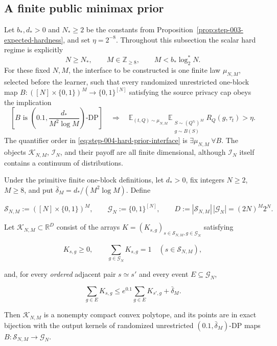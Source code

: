 \subsection{A finite public minimax prior}\label{app:step-004}
Let $b_*,d_*>0$ and $N_*\ge2$ be the constants from
Proposition~\ref{prop:step-003-expected-hardness}, and set
$\eta=2^{-8}$.  Throughout this subsection the scalar hard regime is
explicitly
\begin{equation}
N\ge N_*,\qquad M\in\mathbb Z_{\ge8},\qquad
M<b_*\log_2^*N.
\tag{S4.H}\label{eq:step-004-hard-regime}
\end{equation}
For these fixed $N,M$, the interface to be constructed is one finite law
$\mu_{N,M}$, selected before the learner, such that every randomized
unrestricted one-block map
$B:([N]\times\{0,1\})^M\to\{0,1\}^{[N]}$ satisfying the source privacy cap
obeys the implication
\begin{equation}
\left[
B\text{ is }\left(0.1,\frac{d_*}{M^2\log M}\right)\text{-DP}
\right]
\quad\Longrightarrow\quad
\mathbb E_{(t,Q)\sim\mu_{N,M}}
\mathbb E_{\substack{S\sim(Q^{\tau_t})^M\\g\sim B(S)}}
R_Q(g,\tau_t)>\eta.
\tag{S4.HP}\label{eq:step-004-hard-prior-interface}
\end{equation}
The quantifier order in \eqref{eq:step-004-hard-prior-interface} is
$\exists\mu_{N,M}\ \forall B$.  The objects
$\mathcal K_{N,M}$, $\mathcal I_N$, and their payoff are all finite
dimensional, although $\mathcal I_N$ itself contains a continuum of
distributions.
\begin{lemma}\label{lem:step-004-kernel-polytope}
Under the primitive finite one-block definitions, let \(d_*>0\), fix
integers \(N\ge2\), \(M\ge8\), and put
\(\bar\delta_M=d_*/(M^2\log M)\). Define

\[
\mathcal S_{N,M}:=([N]\times\{0,1\})^M,
\qquad
\mathcal G_N:=\{0,1\}^{[N]},
\qquad
D:=|\mathcal S_{N,M}|\,|\mathcal G_N|=(2N)^M2^N.
\]

Let \(\mathcal K_{N,M}\subset\mathbb R^D\) consist of the arrays
\(K=(K_{s,g})_{s\in\mathcal S_{N,M},g\in\mathcal G_N}\) satisfying

\[
K_{s,g}\ge0,
\qquad
\sum_{g\in\mathcal G_N}K_{s,g}=1
\quad(s\in\mathcal S_{N,M}),
\tag{S4.6}\label{eq:step-004-6}
\]

and, for every \emph{ordered} adjacent pair \(s\simeq s'\) and every event
\(E\subseteq\mathcal G_N\),

\[
\sum_{g\in E}K_{s,g}
\le
e^{0.1}\sum_{g\in E}K_{s',g}+\bar\delta_M.
\tag{S4.7}\label{eq:step-004-7}
\]

Then \(\mathcal K_{N,M}\) is a nonempty compact convex polytope, and its
points are in exact bijection with the output kernels of randomized
unrestricted \((0.1,\bar\delta_M)\)-DP maps
\(B:\mathcal S_{N,M}\to\mathcal G_N\).
\end{lemma}

